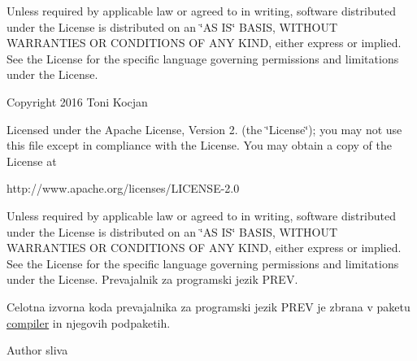 Unless required by applicable law or agreed to in writing, software distributed under the License is distributed on an \char`\"{}\+A\+S I\+S\char`\"{} B\+A\+S\+IS, W\+I\+T\+H\+O\+UT W\+A\+R\+R\+A\+N\+T\+I\+ES OR C\+O\+N\+D\+I\+T\+I\+O\+NS OF A\+NY K\+I\+ND, either express or implied. See the License for the specific language governing permissions and limitations under the License.

Copyright 2016 Toni Kocjan

Licensed under the Apache License, Version 2. (the \char`\"{}\+License\char`\"{}); you may not use this file except in compliance with the License. You may obtain a copy of the License at \begin{DoxyVerb}http://www.apache.org/licenses/LICENSE-2.0
\end{DoxyVerb}


Unless required by applicable law or agreed to in writing, software distributed under the License is distributed on an \char`\"{}\+A\+S I\+S\char`\"{} B\+A\+S\+IS, W\+I\+T\+H\+O\+UT W\+A\+R\+R\+A\+N\+T\+I\+ES OR C\+O\+N\+D\+I\+T\+I\+O\+NS OF A\+NY K\+I\+ND, either express or implied. See the License for the specific language governing permissions and limitations under the License. Prevajalnik za programski jezik P\+R\+EV. 

Celotna izvorna koda prevajalnika za programski jezik P\+R\+EV je zbrana v paketu \hyperlink{namespacecompiler}{compiler} in njegovih podpaketih.

\begin{DoxyAuthor}{Author}
sliva 
\end{DoxyAuthor}
